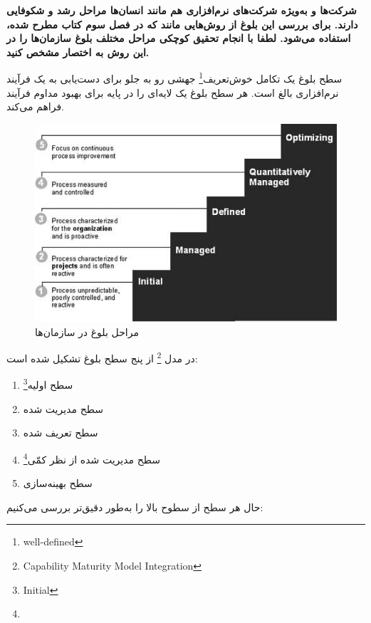 

\textbf{شرکت‌ها و به‌ویژه شرکت‌های نرم‌افزاری هم مانند انسان‌ها مراحل رشد و شکوفایی دارند. برای بررسی این بلوغ از روش‌هایی مانند  که در فصل سوم کتاب مطرح شده، استفاده می‌شود. لطفا با انجام تحقیق کوچکی مراحل مختلف بلوغ سازمان‌ها را در این روش به اختصار مشخص کنید.}


سطح بلوغ یک تکامل خوش‌تعریف\footnote{well-defined} جهشی رو به جلو برای دست‌یابی به یک فرآیند نرم‌افزاری بالغ است. هر سطح بلوغ یک لایه‌ای را در پایه برای بهبود مداوم فرآیند فراهم می‌کند. 
\begin{figure}[!h]
	\begin{center}
		\includegraphics[scale=0.7]{./3.jpg}
	\end{center}
	\caption{مراحل بلوغ در سازمان‌ها}
\end{figure}

در مدل  \footnote{Capability Maturity Model Integration} از پنج سطح بلوغ تشکیل شده است:
\begin{enumerate}
	\item سطح اولیه\footnote{Initial}
	\item سطح مدیریت شده
	\item سطح تعریف شده
	\item سطح مدیریت شده از نظر کمّی\footnote{}

	\item سطح بهینه‌سازی
	
\end{enumerate}

حال هر سطح از سطوح بالا را به‌طور دقیق‌تر بررسی می‌کنیم:

